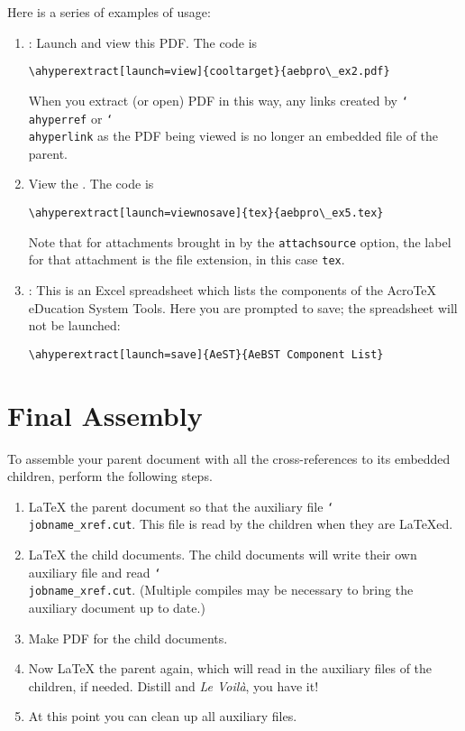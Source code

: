 \documentclass{article}
\newcommand{\cs}[1]{\texttt{\char`\\#1}}
\newcommand\newtopic{\par\ifdim\lastskip>0pt\relax\vskip-\lastskip\fi
\par\vskip6pt\noindent}
\begin{document}
\newtopic Here is a series of examples of usage:
\begin{enumerate}

\item {}: Launch
    and view this PDF. The code is
\begin{verbatim}
\ahyperextract[launch=view]{cooltarget}{aebpro\_ex2.pdf}
\end{verbatim}
When you extract (or open) PDF in this way, any links created
by \cs{ahyperref} or \cs{ahyperlink} as the PDF being viewed is no longer an embedded file of the
parent.

\item View the . The code is
\begin{verbatim}
\ahyperextract[launch=viewnosave]{tex}{aebpro\_ex5.tex}
\end{verbatim}
Note that for attachments brought in by the \texttt{attachsource} option,
the label for that attachment is the file extension, in this case
\texttt{tex}.

\item {}: This is an Excel spreadsheet which lists
the components of the {Acro\negthinspace\TeX} eDucation System
Tools. Here you are prompted to save; the spreadsheet will not be launched:
\begin{verbatim}
\ahyperextract[launch=save]{AeST}{AeBST Component List}
\end{verbatim}
\end{enumerate}

\section{Final Assembly}

To assemble your parent document with all the cross-references to
its embedded children, perform the following steps.
\begin{enumerate}

\item {\LaTeX} the parent document so that the auxiliary file
    \cs{jobname\_xref.cut}. This file is read by the children when they
    are {\LaTeX}ed.

\item {\LaTeX} the child documents. The child documents will write
    their own auxiliary file and read \cs{jobname\_xref.cut}. (Multiple
    compiles may be necessary to bring the auxiliary document up to
    date.)

\item Make PDF for the child documents.

\item Now {\LaTeX} the parent again, which will read in the
    auxiliary files of the children, if needed. Distill and \textsl{Le
    Voil\`{a}}, you have it!

\item At this point you can clean up all auxiliary files.

\end{enumerate}
\end{document}
